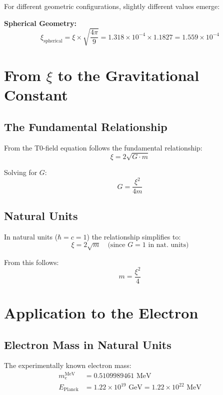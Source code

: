 \documentclass[12pt,a4paper]{article}
\begin{document}
	For different geometric configurations, slightly different values emerge:
	
	\textbf{Spherical Geometry:}
	\begin{equation}
		\xi_{\text{spherical}} = \xi \times \sqrt{\frac{4\pi}{9}} = 1.318 \times 10^{-4} \times 1.1827 = 1.559 \times 10^{-4}
	\end{equation}
	
	\section{From $\xi$ to the Gravitational Constant}
	
	\subsection{The Fundamental Relationship}
	
	From the T0-field equation follows the fundamental relationship:
	\begin{equation}
		\xi = 2\sqrt{G \cdot m}
	\end{equation}
	
	Solving for $G$:
	\begin{equation}
		\boxed{G = \frac{\xi^2}{4m}}
	\end{equation}
	
	\subsection{Natural Units}
	
	In natural units ($\hbar = c = 1$) the relationship simplifies to:
	\begin{equation}
		\xi = 2\sqrt{m} \quad \text{(since } G = 1 \text{ in nat. units)}
	\end{equation}
	
	From this follows:
	\begin{equation}
		m = \frac{\xi^2}{4}
	\end{equation}
	
	\section{Application to the Electron}
	
	\subsection{Electron Mass in Natural Units}
	
	The experimentally known electron mass:
	\begin{align}
		m_e^{\text{MeV}} &= 0.5109989461 \text{ MeV}\\
		E_{\text{Planck}} &= 1.22 \times 10^{19} \text{ GeV} = 1.22 \times 10^{22} \text{ MeV}
	\end{align}
	
\end{document}
